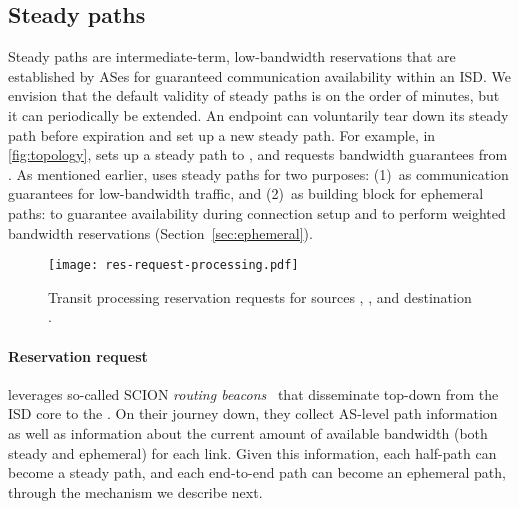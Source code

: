 \subsection{Steady paths}

\noindent Steady paths are intermediate-term, low-bandwidth
reservations that are established by ASes for guaranteed
communication availability within an ISD. We envision that the
default validity of steady paths is on the order of minutes, but it
can periodically be extended. An endpoint \AD can voluntarily tear
down its steady path before expiration and set up a new steady path.
For example, in \autoref{fig:topology},  sets up a steady path
to , and  requests bandwidth guarantees from
. As mentioned earlier, \name uses steady paths for two
purposes: (1)~as communication guarantees for low-bandwidth
traffic, and (2)~as building block for ephemeral paths: to
guarantee availability during connection setup and to perform
weighted bandwidth reservations (Section~\ref{sec:ephemeral}).

\begin{figure}[t]
  \begin{center}
  \texttt{[image: res-request-processing.pdf]}
  \end{center}
  \caption{Transit  processing reservation requests for sources , ,  and
  destination .}
  \vspace{-5mm}
  \label{fig:reservation}
\end{figure}



\paragraph{Reservation request}
\name leverages so-called SCION \emph{routing beacons}~\cite{scion2015} that
disseminate top-down from the ISD core to the \ADs. On their journey down, they
collect AS-level path information as well as information about the current
amount of available bandwidth (both steady and ephemeral) for each link.
\ifFullVersion
Given this information, each half-path can become a steady
path, and each end-to-end path can become an ephemeral path,
through the mechanism we describe next.

